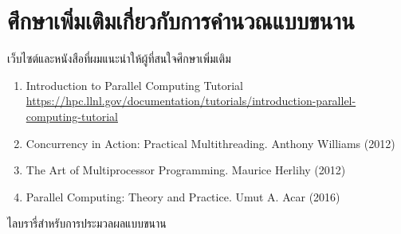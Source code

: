 \section{ศึกษาเพิ่มเติมเกี่ยวกับการคำนวณแบบขนาน}

เว็บไซต์และหนังสือที่ผมแนะนำให้ผู้ที่สนใจศึกษาเพิ่มเติม

\begin{enumerate}[topsep=0pt,noitemsep]
  \setlength\itemsep{0.5em}
  \item Introduction to Parallel Computing Tutorial
        \url{https://hpc.llnl.gov/documentation/tutorials/introduction-parallel-computing-tutorial}

  \item \cpp Concurrency in Action: Practical Multithreading. Anthony Williams (2012)

  \item The Art of Multiprocessor Programming. Maurice Herlihy (2012)

  \item Parallel Computing: Theory and Practice. Umut A. Acar (2016)
\end{enumerate}

ไลบรารี่สำหรับการประมวลผลแบบขนาน

